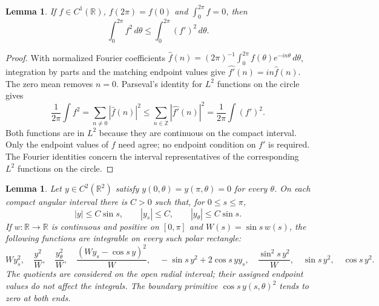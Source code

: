 \documentclass[11pt]{article}
\newtheorem{lemma}[theorem]{Lemma}
\newcommand{\R}{\mathbb R}
\begin{document}
\begin{lemma}\label{lem:angular-wirtinger}
If $f\in C^1(\R)$, $f(2\pi)=f(0)$ and $\int_0^{2\pi}f=0$, then
\[
 \int_0^{2\pi}f^2\,d\theta\leq\int_0^{2\pi}(f')^2\,d\theta.
\]
\end{lemma}

\begin{proof}
With normalized Fourier coefficients
$\widehat f(n)=(2\pi)^{-1}\int_0^{2\pi}f(\theta)e^{-in\theta}\,d\theta$,
integration by parts and the matching endpoint values give
$\widehat{f'}(n)=in\widehat f(n)$. The zero mean removes $n=0$.
Parseval's identity for $L^2$ functions on the circle
\cite[Corollary 2, p.~5]{jerison-fourier} gives
\[
 \frac1{2\pi}\int f^2
   =\sum_{n\ne0}|\widehat f(n)|^2
   \leq\sum_{n\in\mathbb Z}|\widehat{f'}(n)|^2
   =\frac1{2\pi}\int(f')^2.
\]
Both functions are in $L^2$ because they are continuous on the compact interval.
Only the endpoint values of $f$ need agree; no endpoint condition on $f'$ is
required. The Fourier identities concern the interval representatives of the
corresponding $L^2$ functions on the circle.
\end{proof}

\begin{lemma}\label{lem:polar-endpoint-energies}
Let $y\in C^2(\R^2)$ satisfy $y(0,\theta)=y(\pi,\theta)=0$ for every $\theta$.
On each compact angular interval there is $C>0$ such that, for $0\leq s\leq\pi$,
\[
 |y|\leq C\sin s,\qquad |y_s|\leq C,\qquad |y_\theta|\leq C\sin s.
\]
If $w:\R\to\R$ is continuous and positive on $[0,\pi]$ and $W(s)=\sin s\,w(s)$, the
following functions are integrable on every such polar rectangle:
\[
 Wy_s^2,\quad \frac{y^2}{W},\quad \frac{y_\theta^2}{W},\quad
 \frac{(Wy_s-\cos s\,y)^2}{W},\quad
 -\sin s\,y^2+2\cos s\,yy_s,\quad
 \frac{\sin^2s\,y^2}{W},\quad \sin s\,y^2,\quad \cos s\,y^2.
\]
The quotients are considered on the open radial interval; their assigned
endpoint values do not affect the integrals. The boundary primitive
$\cos s\,y(s,\theta)^2$ tends to zero at both ends.
\end{lemma}
\end{document}
